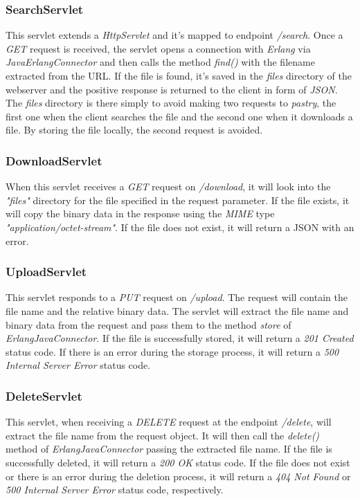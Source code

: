 \documentclass{article}
\begin{document}
\subsubsection{SearchServlet}
This servlet extends a \textit{HttpServlet} and it's mapped to endpoint \textit{/search}. Once a \textit{GET} request is received, the servlet opens a connection with \textit{Erlang} via \textit{JavaErlangConnector} and then calls the method \textit{find()} with the filename extracted from the URL.
\newline
If the file is found, it's saved in the \textit{files} directory of the webserver and the positive response is returned to the client in form of \textit{JSON}. The \textit{files} directory is there simply to avoid making two requests to \textit{pastry}, the first one when the client searches the file and the second one when it downloads a file. By storing the file locally, the second request is avoided.

\subsubsection{DownloadServlet}
When this servlet receives a \textit{GET} request on \textit{/download}, it will look into the \textit{"files"} directory for the file specified in the request parameter. If the file exists, it will copy the binary data in the response using the \textit{MIME} type \textit{"application/octet-stream"}. If the file does not exist, it will return a JSON with an error.

\subsubsection{UploadServlet}
This servlet responds to a \textit{PUT} request on \textit{/upload}. The request will contain the file name and the relative binary data. The servlet will extract the file name and binary data from the request and pass them to the method \textit{store} of \textit{ErlangJavaConnector}. If the file is successfully stored, it will return a \textit{201 Created} status code. If there is an error during the storage process, it will return a \textit{500 Internal Server Error} status code.

\subsubsection{DeleteServlet}
This servlet, when receiving a \textit{DELETE} request at the endpoint \textit{/delete}, will extract the file name from the request object. It will then call the \textit{delete()} method of \textit{ErlangJavaConnector} passing the extracted file name. If the file is successfully deleted, it will return a \textit{200 OK} status code. If the file does not exist or there is an error during the deletion process, it will return a \textit{404 Not Found} or \textit{500 Internal Server Error} status code, respectively.
\end{document}

